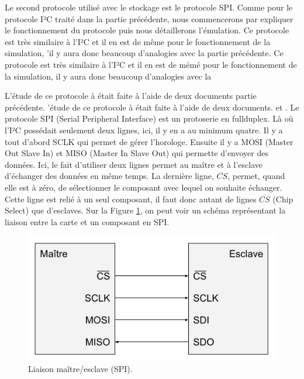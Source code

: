 \documentclass[a4paper]{article}
\begin{document}
Le second protocole utilisé avec le stockage est le protocole SPI. Comme pour le
protocole I²C traité dans la partie précédente, nous commencerons par expliquer
le fonctionnement du protocole puis nous détaillerons l'émulation. Ce protocole
est très similaire à l'I²C et il en est de même pour le fonctionnement de la
simulation, 'il y aura donc beaucoup d'analogies avec la partie précédente.
Ce protocole est très similaire à l'I²C et il en est de mémé pour le
fonctionnement de la simulation, il y aura donc beaucoup d'analogies avec la

L'étude de ce protocole à était faite à l'aide de deux documents partie
précédente. 'étude de ce protocole à était faite à l'aide de deux documents.
\cite{dhaker2018introduction} et \cite{li2014design}. Le protocole SPI (Serial
Peripheral Interface) est un \gls{protoserie} en \gls{fullduplex}. Là où l'I²C
possédait seulement deux lignes, ici, il y en a au minimum quatre. Il y a tout
d'abord SCLK qui permet de gérer l'horologe. Ensuite il y a MOSI (Master Out
Slave In) et MISO (Master In Slave Out) qui permette d'envoyer des données. Ici,
le fait d'utiliser deux lignes permet au maître et à l'esclave d'échanger des
données en même temps. La dernière ligne, $\overline{CS}$, permet, quand elle
est à zéro, de sélectionner le composant avec lequel on souhaite échanger. Cette
ligne est relié à un seul composant, il faut donc autant de lignes
$\overline{CS}$ (Chip Select) que d'esclaves. Sur la Figure \ref{fig:schemaspi},
on peut voir un schéma représentant la liaison entre la carte et un composant en
SPI.

\begin{figure}[h!]
  \begin{center}
    \includegraphics[scale=0.6]{./img/schema-spi.png}
    \caption{Liaison maître/esclave (SPI).}
    \label{fig:schemaspi}
  \end{center}
\end{figure}
\end{document}
